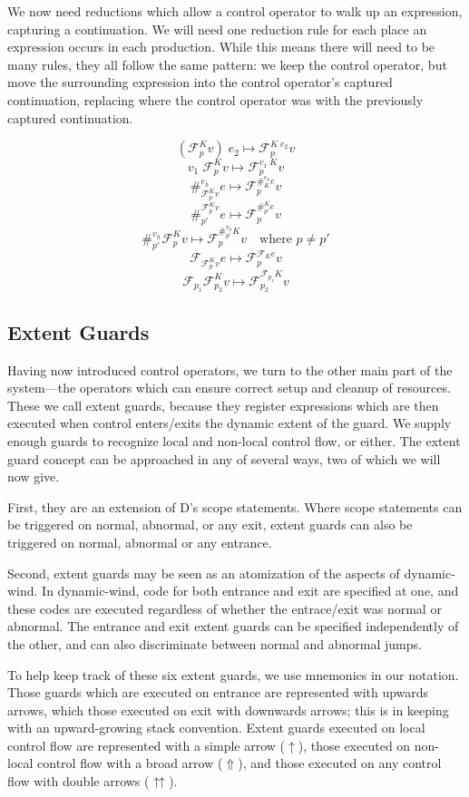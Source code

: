 \documentclass[11pt]{article}
\newcommand{\maybePage}{\newpage}
\newcommand\F{\mathcal{F}}
\begin{document}
We now need reductions which allow a control operator to walk up an expression, capturing a continuation.
We will need one reduction rule for each place an expression occurs in each production.
While this means there will need to be many rules, they all follow the same pattern:
we keep the control operator, but move the surrounding expression into the control operator's captured continuation, replacing where the control operator was with the previously captured continuation.

$$(\F^K_pv)\;e_2 \mapsto \F^{K\;e_2}_pv$$
$$v_1\;\F^K_pv \mapsto \F^{v_1\;K}_pv$$
$$\#_{\F_p^Kv}^{e_h}e \mapsto \F_p^{\#_K^{e_h}e}v$$
$$\#^{\F_p^Kv}_{p'}e \mapsto \F_p^{\#^K_{p'}e}v$$
$$\#_{p'}^{v_h}\F^K_pv \mapsto \F^{\#_{p'}^{v_h}K}_pv
  	\quad\textrm{where }p \neq p'$$
$$\F_{\F^K_pv}e \mapsto \F^{\F_Ke}_pv$$
$$\F_{p_1}\F^K_{p_2}v \mapsto \F^{\F_{p_1}K}_{p_2}v$$

\maybePage
\subsection{Extent Guards}
\label{subsec:extentGuards}

Having now introduced control operators, we turn to the other main part of the system---the operators which can ensure correct setup and cleanup of resources.
These we call extent guards, because they register expressions which are then executed when control enters/exits the dynamic extent of the guard.
We supply enough guards to recognize local and non-local control flow, or either.
The extent guard concept can be approached in any of several ways, two of which we will now give.

First, they are an extension of D's scope statements.
Where scope statements can be triggered on normal, abnormal, or any exit, extent guards can also be triggered on normal, abnormal or any entrance.

Second, extent guards may be seen as an atomization of the aspects of dynamic-wind.
In dynamic-wind, code for both entrance and exit are specified at one, and these codes are executed regardless of whether the entrace/exit was normal or abnormal.
The entrance and exit extent guards can be specified independently of the other, and can also discriminate between normal and abnormal jumps.

To help keep track of these six extent guards, we use mnemonics in our notation.
Those guards which are executed on entrance are represented with upwards arrows, which those executed on exit with downwards arrows; this is in keeping with an upward-growing stack convention.
Extent guards executed on local control flow are represented with a simple arrow ($\uparrow$), those executed on non-local control flow with a broad arrow ($\Uparrow$), and those executed on any control flow with double arrows ($\upuparrows$).
\end{document}
